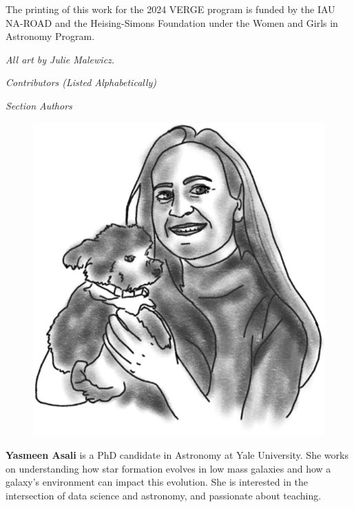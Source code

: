 The printing of this work for the 2024 VERGE program is funded by the IAU NA-ROAD and the Heising-Simons Foundation under the Women and Girls in Astronomy Program.
\\

\vfill
\begin{center}
\textit{\small All art by Julie Malewicz.}  
\end{center}

\pagebreak
\LARGE{\emph{Contributors (Listed Alphabetically)}}
\normalsize
\vspace{20pt}

\Large{\emph{Section Authors}}\\
\vspace{-10pt}
\normalsize

\begin{figure}
\vspace{-\intextsep}
\includegraphics[width=0.9\linewidth]{portraits/yasmeen.png}
\end{figure}
\textbf{Yasmeen Asali} is a PhD candidate in Astronomy at Yale University. She works on understanding how star formation evolves in low mass galaxies and how a galaxy’s environment can impact this evolution. She is interested in the intersection of data science and astronomy, and passionate about teaching.\\
\\


